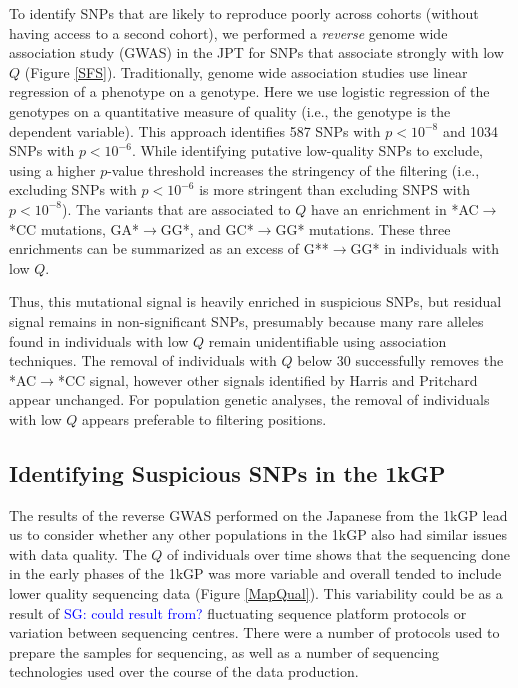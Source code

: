 \documentclass[9pt,lineno]{elife}
\newcommand{\sgcomment}[1]{\textcolor{blue}{SG: #1}}
\begin{document}
To identify SNPs that are likely to reproduce poorly across cohorts (without having access to a second cohort), we performed a \textit{reverse} genome wide association study (GWAS) in the JPT for SNPs that associate strongly with low $Q$ (Figure \ref{SFS}).
Traditionally, genome wide association studies use linear regression of a phenotype on a genotype. 
Here we use logistic regression of the genotypes on a quantitative measure of quality (i.e., the genotype is the dependent variable).
This approach identifies 587 SNPs with $p < 10^{-8}$ and 1034 SNPs with $ p < 10^{-6}$.
While identifying putative low-quality SNPs to exclude, using a higher $p$-value threshold increases the stringency of the filtering (i.e., excluding SNPs with $ p < 10^{-6}$ is more stringent than excluding SNPS with $p < 10^{-8}$). 
The variants that are associated to $Q$ have an enrichment in *AC${\rightarrow}$*CC mutations, GA*${\rightarrow}$GG*, and GC*${\rightarrow}$GG* mutations.
These three enrichments can be summarized as an excess of G**${\rightarrow}$GG* in individuals with low $Q$.

Thus, this mutational signal is heavily enriched in suspicious SNPs, but residual signal remains in non-significant SNPs, presumably because many rare alleles found in individuals with low $Q$ remain unidentifiable using association techniques. 
The removal of individuals with $Q$ below 30 successfully removes the *AC${\rightarrow}$*CC signal, however other signals identified by Harris and Pritchard appear unchanged. 
For population genetic analyses, the removal of individuals with low $Q$ appears preferable to filtering positions.

	\subsection{Identifying Suspicious SNPs in the 1kGP}
The results of the reverse GWAS performed on the Japanese from the 1kGP lead us to consider whether any other populations in the 1kGP also had similar issues with data quality.
The $Q$ of individuals over time shows that the sequencing done in the early phases of the 1kGP was more variable and overall tended to include lower quality sequencing data (Figure \ref{MapQual}).
This variability could be as a result of \sgcomment{could result from?} fluctuating sequence platform protocols or variation between sequencing centres.
There were a number of protocols used to prepare the samples for sequencing, as well as a number of sequencing technologies used over the course of the data production.
\end{document}
